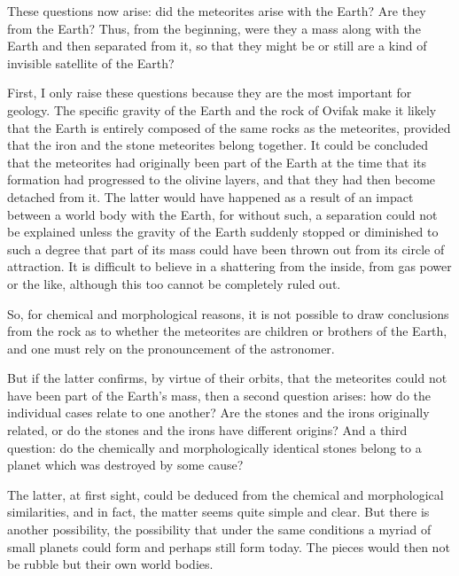 \documentclass[a4paper, 12pt, oneside]{article}
\begin{document}
These questions now arise: did the meteorites arise with the Earth? Are they from the Earth? Thus, from the beginning, were they a mass along with the Earth and then separated from it, so that they might be or still are a kind of invisible satellite of the Earth?

First, I only raise these questions because they are the most important for geology. The specific gravity of the Earth and the rock of Ovifak make it likely that the Earth is entirely composed of the same rocks as the meteorites, provided that the iron and the stone meteorites belong together. It could be concluded that the meteorites had originally been part of the Earth at the time that its formation had progressed to the olivine layers, and that they had then become detached from it. The latter would have happened as a result of an impact between a world body with the Earth, for without such, a separation could not be explained unless the gravity of the Earth suddenly stopped or diminished to such a degree that part of its mass could have been thrown out from its circle of attraction. It is difficult to believe in a shattering from the inside, from gas power or the like, although this too cannot be completely ruled out.

So, for chemical and morphological reasons, it is not possible to draw conclusions from the rock as to whether the meteorites are children or brothers of the Earth, and one must rely on the pronouncement of the astronomer.

But if the latter confirms, by virtue of their orbits, that the meteorites could not have been part of the Earth's mass, then a second question arises: how do the individual cases relate to one another? Are the stones and the irons originally related, or do the stones and the irons have different origins? And a third question: do the chemically and morphologically identical stones belong to a planet which was destroyed by some cause?

The latter, at first sight, could be deduced from the chemical and morphological similarities, and in fact, the matter seems quite simple and clear. But there is another possibility, the possibility that under the same conditions a myriad of small planets could form and perhaps still form today. The pieces would then not be rubble but their own world bodies.
\end{document}

